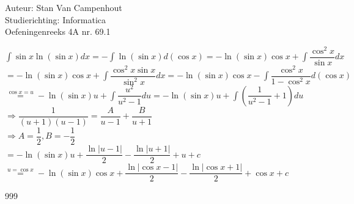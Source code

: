\documentclass[a4paper]{article}
\begin{document}
  
\noindent \large Auteur: Stan Van Campenhout \\
\noindent \large Studierichting:  Informatica\\
\noindent \large Oefeningenreeks 4A nr. 69.1\\

\medskip

\normalsize

$ \displaystyle\int\sin x\ln\left(\sin x\right)dx = -\displaystyle\int\ln\left(\sin x\right)d\left(\cos x\right) = -\ln\left(\sin x\right)\cos x +\displaystyle\int\dfrac{\cos^2x}{\sin x}dx $\\

$ = -\ln\left(\sin x\right)\cos x +\displaystyle\int\dfrac{\cos^2x\sin x}{\sin^2 x}dx
= -\ln\left(\sin x\right)\cos x -\displaystyle\int\dfrac{\cos^2x}{1-\cos^2 x}d\left(\cos x\right) $\\

$ \stackrel{\cos x = u}{=} -\ln\left(\sin x\right)u +\displaystyle\int\dfrac{u^2}{u^2-1}du = -\ln\left(\sin x\right)u +\displaystyle\int\left(\dfrac{1}{u^2-1}+1\right)du  $\\

$ \Rightarrow \dfrac{1}{\left(u+1\right)\left(u-1\right)} = \dfrac{A}{u-1} + \dfrac{B}{u+1} $\\

$ \Rightarrow A = \dfrac{1}{2}, B = -\dfrac{1}{2} $\\

$ = -\ln\left(\sin x\right)u + \dfrac{\ln\left|u-1\right|}{2}-\dfrac{\ln\left|u+1\right|}{2} + u + c $\\

$ \stackrel{ u = \cos x}{=} -\ln\left(\sin x\right)\cos x + \dfrac{\ln\left|\cos x-1\right|}{2}-\dfrac{\ln\left|\cos x+1\right|}{2} + \cos x + c $\\

\begin{thebibliography}{999}
\end{thebibliography}
\end{document}
